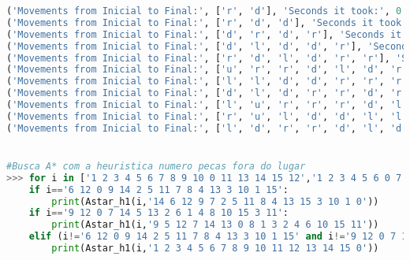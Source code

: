\documentclass{article}
\begin{document}
\begin{lstlisting}[language = Python]
('Movements from Inicial to Final:', ['r', 'd'], 'Seconds it took:', 0.0029954910278320312, 'Space used:', 6)
('Movements from Inicial to Final:', ['r', 'd', 'd'], 'Seconds it took:', 0.0020046234130859375, 'Space used:', 9)
('Movements from Inicial to Final:', ['d', 'r', 'd', 'r'], 'Seconds it took:', 0.00299835205078125, 'Space used:', 14)
('Movements from Inicial to Final:', ['d', 'l', 'd', 'd', 'r'], 'Seconds it took:', 0.002997159957885742, 'Space used:', 14)
('Movements from Inicial to Final:', ['r', 'd', 'l', 'd', 'r', 'r'], 'Seconds it took:', 0.003996849060058594, 'Space used:', 14)
('Movements from Inicial to Final:', ['u', 'r', 'r', 'd', 'l', 'd', 'r'], 'Seconds it took:', 0.004996776580810547, 'Space used:', 21)
('Movements from Inicial to Final:', ['l', 'l', 'd', 'd', 'r', 'r', 'r', 'd'], 'Seconds it took:', 0.0029973983764648438, 'Space used:', 12)
('Movements from Inicial to Final:', ['d', 'l', 'd', 'r', 'r', 'd', 'r', 'u', 'l', 'l', 'l', 'd', 'r', 'u', 'r', 'r', 'd'], 'Seconds it took:', 0.00899505615234375, 'Space used:', 31)
('Movements from Inicial to Final:', ['l', 'u', 'r', 'r', 'r', 'd', 'l', 'u', 'l', 'u', 'u', 'r', 'd', 'd', 'd', 'r'], 'Seconds it took:', 0.010993003845214844, 'Space used:', 36)
('Movements from Inicial to Final:', ['r', 'u', 'l', 'd', 'd', 'l', 'l', 'u', 'r', 'r', 'd', 'r'], 'Seconds it took:', 0.006995201110839844, 'Space used:', 27)
('Movements from Inicial to Final:', ['l', 'd', 'r', 'r', 'd', 'l', 'd', 'l', 'l', 'u', 'r', 'r', 'u'], 'Seconds it took:', 0.005995988845825195, 'Space used:', 23)


#Busca A* com a heuristica numero pecas fora do lugar
>>> for i in ['1 2 3 4 5 6 7 8 9 10 0 11 13 14 15 12','1 2 3 4 5 6 0 7 9 10 11 8 13 14 15 12','1 2 3 4 5 0 7 8 9 6 10 12 13 14 11 15','1 2 3 0 5 6 8 4 9 10 7 12 13 14 11 15','1 2 3 4 5 0 6 8 9 11 7 12 13 10 14 15','1 2 3 4 5 10 6 7 9 0 12 8 13 14 11 15','6 12 0 9 14 2 5 11 7 8 4 13 3 10 1 15','1 0 3 4 6 2 7 8 5 14 10 12 9 13 11 15','1 6 2 4 5 10 3 8 13 9 7 11 14 0 15 12','1 2 3 4 5 6 8 12 13 9 0 7 14 11 10 15','9 12 0 7 14 5 13 2 6 1 4 8 10 15 3 11']:
	if i=='6 12 0 9 14 2 5 11 7 8 4 13 3 10 1 15':
		print(Astar_h1(i,'14 6 12 9 7 2 5 11 8 4 13 15 3 10 1 0'))
	if i=='9 12 0 7 14 5 13 2 6 1 4 8 10 15 3 11':
		print(Astar_h1(i,'9 5 12 7 14 13 0 8 1 3 2 4 6 10 15 11'))
	elif (i!='6 12 0 9 14 2 5 11 7 8 4 13 3 10 1 15' and i!='9 12 0 7 14 5 13 2 6 1 4 8 10 15 3 11'):
		print(Astar_h1(i,'1 2 3 4 5 6 7 8 9 10 11 12 13 14 15 0'))


\end{lstlisting}
\end{document}
